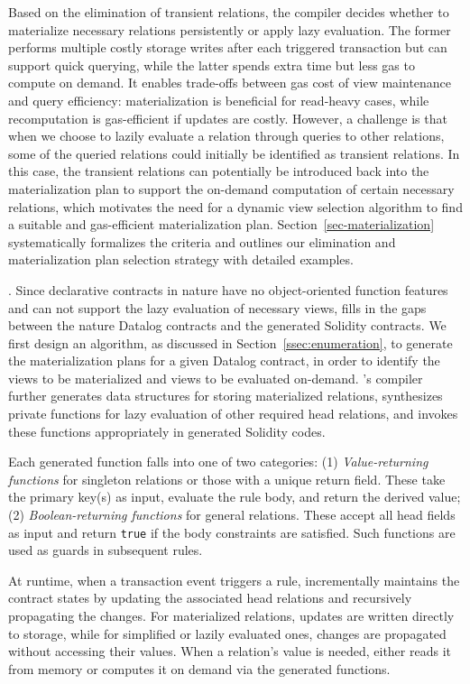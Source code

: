 Based on the elimination of transient relations, the compiler decides whether to materialize necessary relations persistently or apply lazy evaluation.
The former performs multiple costly storage writes after each triggered transaction but can support quick querying, while the latter spends extra time but less gas to compute on demand. It enables trade-offs between gas cost of view maintenance and query efficiency: materialization is beneficial for read-heavy cases, while recomputation is gas-efficient if updates are costly.
However, a challenge is that when we choose to lazily evaluate a relation through queries to other relations, some of the queried relations could initially be identified as transient relations. In this case, the transient relations can potentially be introduced back into the materialization plan to support the on-demand computation of certain necessary relations, which motivates the need for a dynamic view selection algorithm to find a suitable and gas-efficient materialization plan.
Section~\ref{sec-materialization} systematically formalizes the criteria 
and outlines our elimination and materialization plan selection strategy with detailed examples.

.
Since declarative contracts in nature have no object-oriented function features and can not support the lazy evaluation of necessary views, \proto fills in the gaps between the nature Datalog contracts and the generated Solidity contracts. 
We first design an algorithm, as discussed in Section~\ref{ssec:enumeration}, to generate the materialization plans for a given Datalog contract, in order to identify the views to be materialized and views to be evaluated on-demand. \proto's compiler further generates data structures for storing materialized relations, synthesizes private functions for lazy evaluation of other required head relations, and invokes these functions appropriately in generated Solidity codes.

Each generated function falls into one of two categories:
(1) \emph{Value-returning functions} for singleton relations or those with a unique
return field. These take the primary key(s) as input, evaluate the rule body, and
return the derived value;
(2) \emph{Boolean-returning functions} for general relations. These accept all head
fields as input and return \texttt{true} if the body constraints are satisfied.
Such functions are used as guards in subsequent rules.


At runtime, when a transaction event triggers a rule, \proto incrementally maintains the contract states by updating the associated head relations and recursively propagating the changes. For materialized relations, updates are written directly to storage, while for simplified or lazily evaluated ones, changes are propagated without accessing their values. When a relation’s value is needed, \proto either reads it from memory or computes it on demand via the generated functions.

